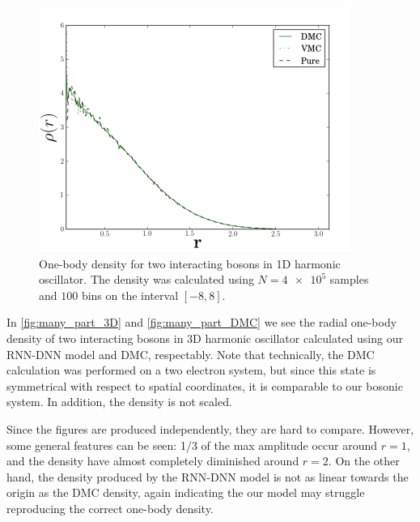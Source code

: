 \begin{figure}[H]
	\includegraphics[scale=0.6]{figures/onebody3d.png}
	\caption{One-body density for two interacting bosons in 1D harmonic
      oscillator. The density was calculated using $N=\num{4e5}$ samples and $100$
      bins on the interval $[-8,8]$.} 
	\label{fig:many_part_DMC}
\end{figure}

In \autoref{fig:many_part_3D} and \autoref{fig:many_part_DMC} we see the radial
one-body density of two interacting bosons in 3D harmonic oscillator calculated
using our RNN-DNN model and DMC, respectably. Note that technically, the DMC
calculation was performed on a two electron system, but since this state is
symmetrical with respect to spatial coordinates, it is comparable to our bosonic
system. In addition, the density is not scaled. 

Since the figures are produced independently, they are hard to compare. However,
some general features can be seen: 1/3 of the max amplitude occur around $r=1$,
and the density have almost completely diminished around $r=2$. On the other
hand, the density produced by the RNN-DNN model is not as linear towards the
origin as the DMC density, again indicating the our model may struggle
reproducing the correct one-body density. 


